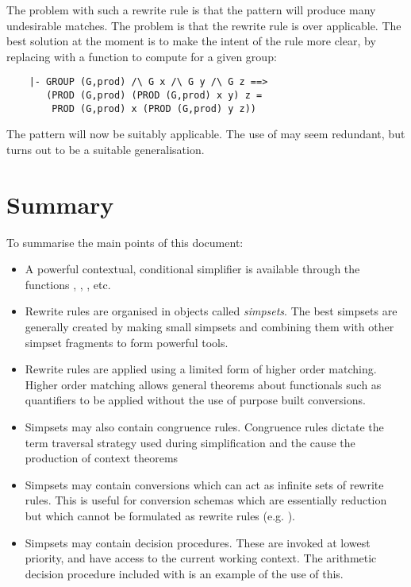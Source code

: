 \documentclass[a4]{article}
\begin{document}
The problem with such a rewrite rule is that the pattern
 will produce many undesirable matches.
The problem is that the rewrite rule is over applicable.  The
best solution at the moment is to make the intent of the rule
more clear, by replacing  with a function
to compute  for a given group:
\begin{hol} \begin{verbatim}
    |- GROUP (G,prod) /\ G x /\ G y /\ G z ==>
       (PROD (G,prod) (PROD (G,prod) x y) z =
        PROD (G,prod) x (PROD (G,prod) y z))
\end{verbatim} \end{hol}
The pattern  will
now be suitably applicable.  The use of  may seem
redundant, but turns out to be a suitable generalisation.

\section{Summary}

To summarise the main points of this document:
\begin{itemize}
    \item A powerful contextual, conditional simplifier is available
    through the functions , ,
    ,  etc.
    \item Rewrite rules are organised in objects called {\it simpsets}.
    The best simpsets are generally created by making small simpsets and
    combining them with other simpset fragments to form powerful tools.
    \item Rewrite rules are applied using a limited form of higher
    order matching.  Higher order matching allows general theorems about
    functionals such as quantifiers to be applied without the use
    of purpose built conversions.
    \item Simpsets may also contain congruence rules.  Congruence
    rules dictate the term traversal strategy used during simplification
    and the cause the production of context theorems
    \item Simpsets may contain conversions which can act as infinite sets
    of rewrite rules.  This is useful for conversion schemas
    which are essentially reduction but which cannot be formulated
    as rewrite rules (e.g. ).
    \item Simpsets may contain decision procedures.  These are invoked
    at lowest priority, and have access to the current working
    context.  The arithmetic decision procedure included with
     is an example of the use of this.
\end{itemize}
\end{document}
